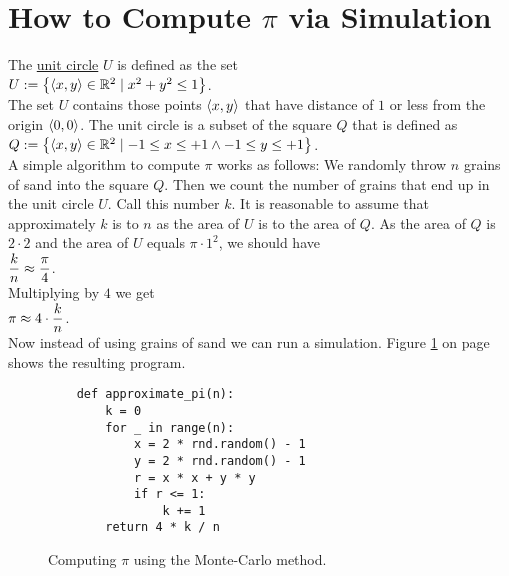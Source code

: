 \section{How to Compute $\pi$ via Simulation}
The \href{https://en.wikipedia.org/wiki/Unit_circle}{unit circle} $U$ is defined as the set 
\\[0.2cm]
\hspace*{1.3cm}
$U := \bigl\{ \pair(x,y) \in \mathbb{R}^2 \mid x^2 + y^2 \leq 1 \bigr\}$.
\\[0.2cm]
The set $U$ contains those points $\pair(x,y)$ that have distance of $1$ or less from the origin
$\pair(0,0)$.  The unit circle is a subset of the square $Q$ that is defined as 
\\[0.2cm]
\hspace*{1.3cm}
$Q := \bigl\{ \pair(x,y) \in \mathbb{R}^2 \mid -1 \leq x \leq +1 \wedge -1 \leq y \leq +1 \bigr\}$.
\\[0.2cm]
A simple algorithm to compute $\pi$ works as follows:  We randomly throw $n$ grains of sand into the square $Q$.
Then we count the number of grains that end up in the unit circle $U$.  Call this number $k$.
It is reasonable to assume that approximately $k$ is to $n$ as the area of $U$ is to the area of $Q$.  As the area of $Q$ is
$2 \cdot 2$ and the area of $U$ equals $\pi \cdot 1^2$, we should have
\\[0.2cm]
\hspace*{1.3cm}
$\displaystyle\frac{k}{n} \approx \frac{\pi}{4}$.
\\[0.2cm]
Multiplying by $4$ we get
\\[0.2cm]
\hspace*{1.3cm}
$\displaystyle \pi \approx 4 \cdot \frac{k}{n}$.
\\[0.2cm]
Now instead of using grains of sand we can run a simulation.  Figure \ref{fig:Monte-Carlo-Pi.ipynb} on page
\pageref{fig:Monte-Carlo-Pi.ipynb} shows the resulting program.


\begin{figure}[!ht]
\centering
\begin{verbatim}
    def approximate_pi(n):
        k = 0
        for _ in range(n):
            x = 2 * rnd.random() - 1
            y = 2 * rnd.random() - 1
            r = x * x + y * y
            if r <= 1:
                k += 1
        return 4 * k / n
\end{verbatim}
\vspace*{-0.3cm}
\caption{Computing $\pi$ using the Monte-Carlo method.}
\label{fig:Monte-Carlo-Pi.ipynb}
\end{figure}

